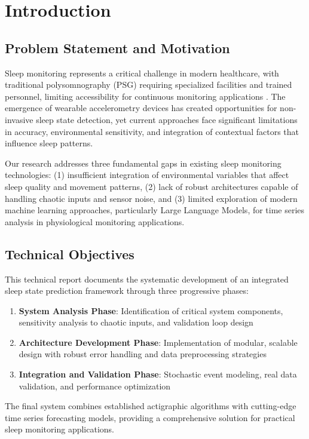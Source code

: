 \documentclass[conference]{IEEEtran}
\begin{document}
\section{Introduction}
\subsection{Problem Statement and Motivation}
Sleep monitoring represents a critical challenge in modern healthcare, with traditional polysomnography (PSG) requiring specialized facilities and trained personnel, limiting accessibility for continuous monitoring applications \cite{AccelerometryReview}. The emergence of wearable accelerometry devices has created opportunities for non-invasive sleep state detection, yet current approaches face significant limitations in accuracy, environmental sensitivity, and integration of contextual factors that influence sleep patterns.

Our research addresses three fundamental gaps in existing sleep monitoring technologies: (1) insufficient integration of environmental variables that affect sleep quality and movement patterns, (2) lack of robust architectures capable of handling chaotic inputs and sensor noise, and (3) limited exploration of modern machine learning approaches, particularly Large Language Models, for time series analysis in physiological monitoring applications.

\subsection{Technical Objectives}
This technical report documents the systematic development of an integrated sleep state prediction framework through three progressive phases:
\begin{enumerate}
    \item \textbf{System Analysis Phase}: Identification of critical system components, sensitivity analysis to chaotic inputs, and validation loop design
    \item \textbf{Architecture Development Phase}: Implementation of modular, scalable design with robust error handling and data preprocessing strategies  
    \item \textbf{Integration and Validation Phase}: Stochastic event modeling, real data validation, and performance optimization
\end{enumerate}

The final system combines established actigraphic algorithms with cutting-edge time series forecasting models, providing a comprehensive solution for practical sleep monitoring applications.
\end{document}
